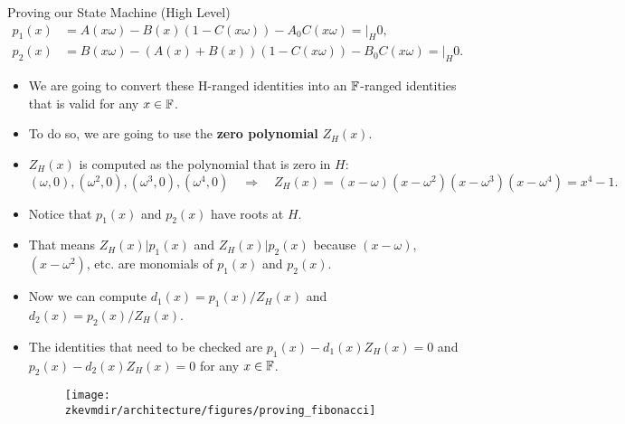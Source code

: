 \begin{frame}[allowframebreaks]{Proving our State Machine (High Level)}
\begin{align*}
p_1(x)&= A(x\omega) - B(x)(1 - C(x\omega)) - A_0C(x\omega) = \bigg\lvert_H 0,\\
p_2(x) &= B(x\omega) - (A(x) + B(x))(1 - C(x\omega)) - B_0 C(x\omega) = \bigg\lvert_H 0.
\end{align*}

\begin{itemize}
\item We are going to convert these H-ranged identities into an $\mathbb{F}$-ranged identities that 
is valid for any $x \in \mathbb{F}$.
\item To do so, we are going to use the \textbf{zero polynomial} $Z_H(x)$.
\item $Z_H(x)$ is computed as the polynomial that is zero in $H$:
\[
(\omega,0), (\omega^2,0), (\omega^3,0), (\omega^4,0) \quad \Longrightarrow \quad Z_H(x) = (x-\omega)(x-\omega^2)(x-\omega^3)(x-\omega^4) = x^4-1.
\]
\item Notice that $p_1(x)$ and $p_2(x)$ have roots at $H$.
\item That means $Z_H(x) | p_1(x)$ and $Z_H(x) | p_2(x)$ 
because $(x-\omega)$, $(x-\omega^2)$, etc. are monomials of $p_1(x)$ and  $p_2(x)$.
\item Now we can compute $d_1(x) = p_1(x) / Z_H(x)$ and $d_2(x) = p_2(x) / Z_H(x)$.
\item The identities that need to be checked are $p_1(x) - d_1(x)Z_H(x) = 0$ and $p_2(x) - d_2(x)Z_H(x) = 0$ 
for any $x \in \mathbb{F}$.
\begin{figure}
\texttt{[image: \\zkevmdir/architecture/figures/proving\_fibonacci]}
\end{figure}
\end{itemize}
\end{frame}
